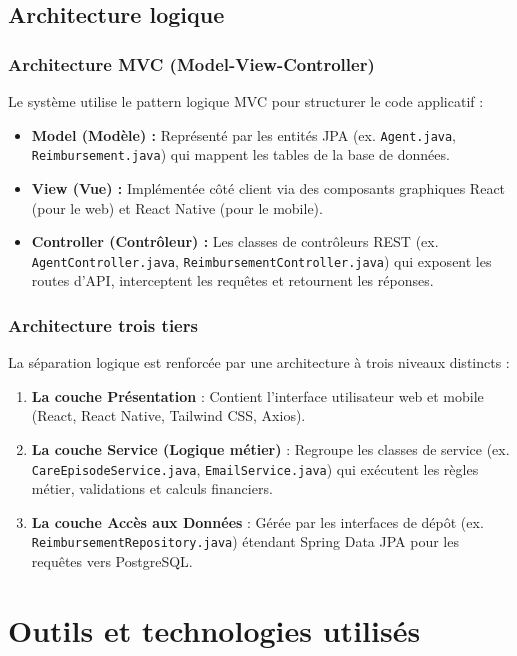 \subsection{Architecture logique}

\subsubsection{Architecture MVC (Model-View-Controller)}
Le système utilise le pattern logique MVC pour structurer le code applicatif :
\begin{itemize}
    \item \textbf{Model (Modèle) :} Représenté par les entités JPA (ex. \texttt{Agent.java}, \texttt{Reimbursement.java}) qui mappent les tables de la base de données.
    \item \textbf{View (Vue) :} Implémentée côté client via des composants graphiques React (pour le web) et React Native (pour le mobile).
    \item \textbf{Controller (Contrôleur) :} Les classes de contrôleurs REST (ex. \texttt{AgentController.java}, \texttt{ReimbursementController.java}) qui exposent les routes d'API, interceptent les requêtes et retournent les réponses.
\end{itemize}

\subsubsection{Architecture trois tiers}
La séparation logique est renforcée par une architecture à trois niveaux distincts :
\begin{enumerate}
    \item \textbf{La couche Présentation} : Contient l'interface utilisateur web et mobile (React, React Native, Tailwind CSS, Axios).
    \item \textbf{La couche Service (Logique métier)} : Regroupe les classes de service (ex. \texttt{CareEpisodeService.java}, \texttt{EmailService.java}) qui exécutent les règles métier, validations et calculs financiers.
    \item \textbf{La couche Accès aux Données} : Gérée par les interfaces de dépôt (ex. \texttt{ReimbursementRepository.java}) étendant Spring Data JPA pour les requêtes vers PostgreSQL.
\end{enumerate}

\section{Outils et technologies utilisés}
\label{sec:outils_technologies_utilises}

